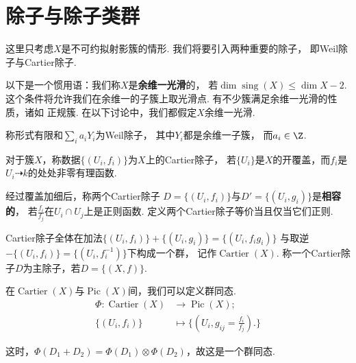 \section{除子与除子类群}
    这里只考虑$X$是不可约拟射影簇的情形. 我们将要引入两种重要的除子，
    即Weil除子与Cartier除子. \par

    以下是一个惯用语：我们称$X$是\textbf{余维一光滑}的，
    若$\dim\operatorname{sing}(X) \leq \dim X - 2$.
    这个条件将允许我们在余维一的子簇上取光滑点. 有不少簇满足余维一光滑的性质，诸如
    正规簇. 在以下讨论中，我们都假定$X$余维一光滑.

    \begin{definition}
        称形式有限和$\sum_{i}a_{i}Y_{i}$为Weil除子，
        其中$Y_{i}$都是余维一子簇，
        而$a_{i} \in \Z$.
    \end{definition}

    \begin{definition}
        对于簇$X$，称数据$\{(U_{i},f_{i})\}$为$X$上的Cartier除子，
        若$\{U_{i}\}$是$X$的开覆盖，而$f_{i}$是$U_{i} \dashrightarrow k$的处处非零有理函数. \par
        经过覆盖加细后，称两个Cartier除子
        $D=\{(U_{i},f_{i})\}$与$D'=\{(U_{i},g_{i})\}$是\textbf{相容的}，
        若$\frac{f_{i}}{f_{j}}$在$U_{i} \cap U_{j}$上是正则函数. 
        定义两个Cartier除子等价当且仅当它们正则.
    \end{definition}

    Cartier除子全体在加法$\{(U_{i},f_{i})\} + \{(U_{i},g_{i})\} = \{(U_{i},f_{i}g_{i})\}$
    与取逆$-\{(U_{i},f_{i})\}=\{(U_{i},f_{i}^{-1})\}$下构成一个群，
    记作$\operatorname{Cartier}(X)$. 
    称一个Cartier除子$D$为主除子，若$D=\{(X,f)\}$. 

    在$\operatorname{Cartier}(X)$与$\operatorname{Pic}(X)$间，我们可以定义群同态.
    \begin{equation*}\begin{aligned}
        \Phi\colon\operatorname{Cartier}(X) &\longrightarrow \operatorname{Pic}(X); \\
        \{(U_{i},f_{i})\} &\longmapsto \{(U_{i},g_{ij}=\frac{f_{i}}{f_{j}}).\}
    \end{aligned}\end{equation*}

    这时，$\Phi(D_{1}+D_{2})=\Phi(D_{1}) \otimes \Phi(D_{2})$，故这是一个群同态.

